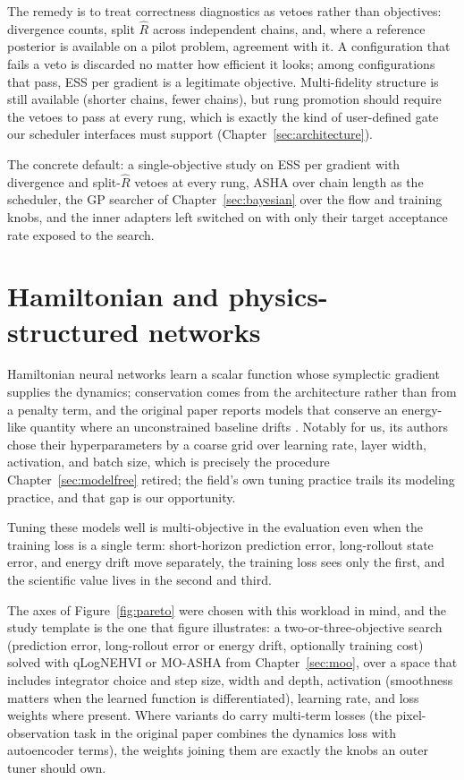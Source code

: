 The remedy is to treat correctness diagnostics as
vetoes rather than objectives: divergence counts, split $\widehat{R}$
across independent chains, and, where a reference posterior is available
on a pilot problem, agreement with it. A configuration that fails a veto
is discarded no matter how efficient it looks; among configurations that
pass, ESS per gradient is a legitimate objective. Multi-fidelity
structure is still available (shorter chains, fewer chains), but rung
promotion should require the vetoes to pass at every rung, which is
exactly the kind of user-defined gate our scheduler interfaces must
support (Chapter~\ref{sec:architecture}).

The concrete default: a single-objective study on ESS per gradient with
divergence and split-$\widehat{R}$ vetoes at every rung, ASHA over chain
length as the scheduler, the GP searcher of Chapter~\ref{sec:bayesian}
over the flow and training knobs, and the inner adapters left switched
on with only their target acceptance rate exposed to the search.

\section{Hamiltonian and physics-structured networks}

Hamiltonian neural networks learn a scalar function whose symplectic
gradient supplies the dynamics; conservation comes from the architecture
rather than from a penalty term, and the original paper reports models
that conserve an energy-like quantity where an unconstrained baseline
drifts \citep{greydanus2019hnn}. Notably for us, its authors chose their
hyperparameters by a coarse grid over learning rate, layer width,
activation, and batch size, which is precisely the procedure
Chapter~\ref{sec:modelfree} retired; the field's own tuning practice
trails its modeling practice, and that gap is our opportunity.

Tuning these models well is multi-objective in the evaluation even when
the training loss is a single term: short-horizon prediction error,
long-rollout state error, and energy drift move separately, the training
loss sees only the first, and the scientific value lives in the second
and third.

The axes of Figure~\ref{fig:pareto} were chosen with this
workload in mind, and the study template is the one that figure
illustrates: a two-or-three-objective search (prediction error,
long-rollout error or energy drift, optionally training cost) solved
with qLogNEHVI or MO-ASHA from Chapter~\ref{sec:moo}, over a space that
includes integrator choice and step size, width and depth, activation
(smoothness matters when the learned function is differentiated),
learning rate, and loss weights where present. Where variants do carry
multi-term losses (the pixel-observation task in the original paper
combines the dynamics loss with autoencoder terms), the weights joining
them are exactly the knobs an outer tuner should own.

